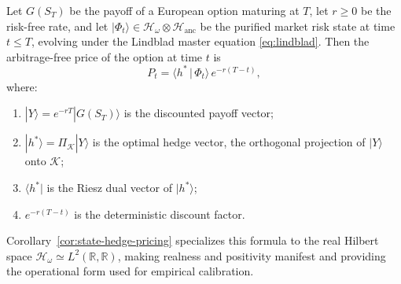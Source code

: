 \begin{theorem}\label{thm:pricing}
Let $G(S_T)$ be the payoff of a European option maturing at $T$, let $r \geq 0$ be
the risk-free rate, and let
$|\Phi_t\rangle \in \mathcal{H}_\omega \otimes \mathcal{H}_{\mathrm{anc}}$ be the
purified market risk state at time $t \leq T$, evolving under the Lindblad master
equation \eqref{eq:lindblad}. Then the arbitrage-free price of the option at time
$t$ is
\begin{equation}\label{eq:pricing-master}
    P_t = \langle h^* \,|\, \Phi_t \rangle \, e^{-r(T-t)},
\end{equation}
where:
\begin{enumerate}
    \item[(i)] $|Y\rangle = e^{-rT} |G(S_T)\rangle$ is the discounted payoff vector;
    \item[(ii)] $|h^*\rangle = \Pi_{\mathcal{K}} |Y\rangle$ is the optimal hedge
        vector, the orthogonal projection of $|Y\rangle$ onto $\mathcal{K}$;
    \item[(iii)] $\langle h^* |$ is the Riesz dual vector of $|h^*\rangle$;
    \item[(iv)] $e^{-r(T-t)}$ is the deterministic discount factor.
\end{enumerate}
Corollary~\ref{cor:state-hedge-pricing} specializes this formula to the real Hilbert
space $\mathcal{H}_\omega \simeq L^2(\mathbb{R}, \mathbb{R})$, making realness and
positivity manifest and providing the operational form used for empirical
calibration.
\end{theorem}

